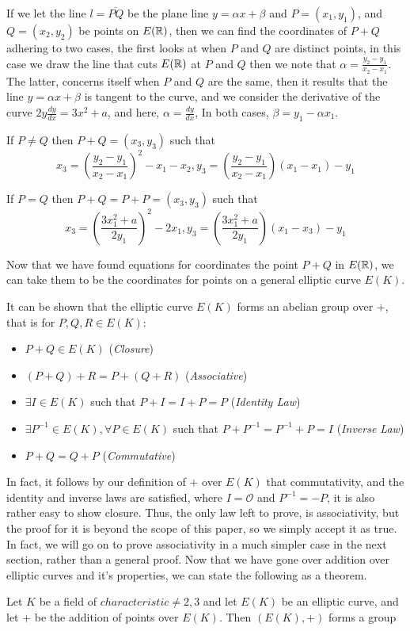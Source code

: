If we let the line $l=\overline{PQ}$ be the plane line $y=\alpha x+\beta$ and $P=(x_1,y_1)$, and $Q=(x_2,y_2)$ be points on $E(\mathbb{R})$, then we can find the coordinates of $P+Q$ adhering to two cases, the first looks at when $P$ and $Q$ are distinct points, in this case we draw the line that cuts $E(\mathbb{R})$ at $P$ and $Q$ then we note that $\alpha=\frac{y_2-y_1}{x_2-x_1}$. The latter, concerns itself when $P$ and $Q$ are the same, then it results that the line $y=\alpha x+\beta$ is tangent to the curve, and we consider the derivative of the curve $2y\frac{dy}{dx}=3x^2+a$, and here, $\alpha=\frac{dy}{dx}$, In both cases, $\beta=y_1-\alpha x_1$.

\underline{} If $P \neq Q$ then $P+Q=(x_3,y_3)$ such that
\begin{equation}
    x_3=(\frac{y_2-y_1}{x_2-x_1})^2-x_1-x_2, y_3=(\frac{y_2-y_1}{x_2-x_1})(x_1-x_1)-y_1
\end{equation}

\underline{} If $P=Q$ then $P+Q=P+P=(x_3,y_3)$ such that
\begin{equation}
    x_3=(\frac{3x_1^2+a}{2y_1})^2-2x_1, y_3=(\frac{3x_1^2+a}{2y_1})(x_1-x_3)-y_1
\end{equation}

Now that we have found equations for coordinates the point $P+Q$ in $E(\mathbb{R})$, we can take them to be the coordinates for points on a general elliptic curve $E(K)$.

\hspace{10mm}It can be shown that the elliptic curve $E(K)$ forms an abelian group over $+$, that is for $P,Q,R \in E(K)$:
\begin{itemize}
    \item $P+Q \in E(K)$ (\textit{Closure})
    \item $(P+Q)+R=P+(Q+R)$ (\textit{Associative})
    \item $\exists I \in E(K)$ such that $P+I=I+P=P$ (\textit{Identity Law})
    \item $\exists P^{-1} \in E(K),  \forall P \in E(K)$ such that $P+P^{-1}=P^{-1}+P=I$ (\textit{Inverse Law})
    \item $P+Q=Q+P$ (\textit{Commutative})
\end{itemize}
In fact, it follows by our definition of $+$ over $E(K)$ that commutativity, and the identity and inverse laws are satisfied, where $I=\mathcal{O}$ and $P^{-1}=-P$, it is also rather easy to show closure. Thus, the only law left to prove, is associativity, but the proof for it is beyond the scope of this paper, so we simply accept it as true. In fact, we will go on to prove associativity in a much simpler case in the next section, rather than a general proof. Now that we have gone over addition over elliptic curves and it's properties, we can state the following as a theorem.
\begin{theorem}
    Let $K$ be a field of $characteristic \neq 2,3$ and let $E(K)$ be an elliptic curve, and let $+$ be the addition of points over $E(K)$. Then $(E(K),+)$ forms a group
\end{theorem}

